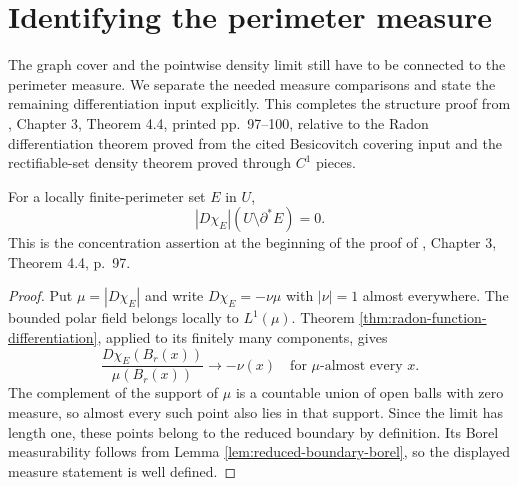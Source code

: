 \chapter{Identifying the perimeter measure}\label{sec:perimeter-measure-identification}
The graph cover and the pointwise density limit still have to be connected to the perimeter measure. We separate the needed measure comparisons and state the remaining differentiation input explicitly. This completes the structure proof from \cite{Sim18}, Chapter 3, Theorem 4.4, printed pp.~97--100, relative to the Radon differentiation theorem proved from the cited Besicovitch covering input and the rectifiable-set density theorem proved through $C^1$ pieces.

\begin{corollary}\label{cor:perimeter-concentrated-reduced-boundary}
For a locally finite-perimeter set $E$ in $U$,
\[
 |D\chi_E|(U\setminus\partial^*E)=0.
\]
This is the concentration assertion at the beginning of the proof of \cite{Sim18}, Chapter 3, Theorem 4.4, p.~97.
\end{corollary}
\begin{proof}
Put $\mu=|D\chi_E|$ and write $D\chi_E=-\nu\mu$ with $|\nu|=1$ almost everywhere. The bounded polar field belongs locally to $L^1(\mu)$. Theorem \ref{thm:radon-function-differentiation}, applied to its finitely many components, gives
\[
 \frac{D\chi_E(B_r(x))}{\mu(B_r(x))}\longrightarrow-\nu(x)
 \quad\text{for }\mu\text{-almost every }x.
\]
The complement of the support of $\mu$ is a countable union of open balls with zero measure, so almost every such point also lies in that support. Since the limit has length one, these points belong to the reduced boundary by definition. Its Borel measurability follows from Lemma \ref{lem:reduced-boundary-borel}, so the displayed measure statement is well defined.
\end{proof}

